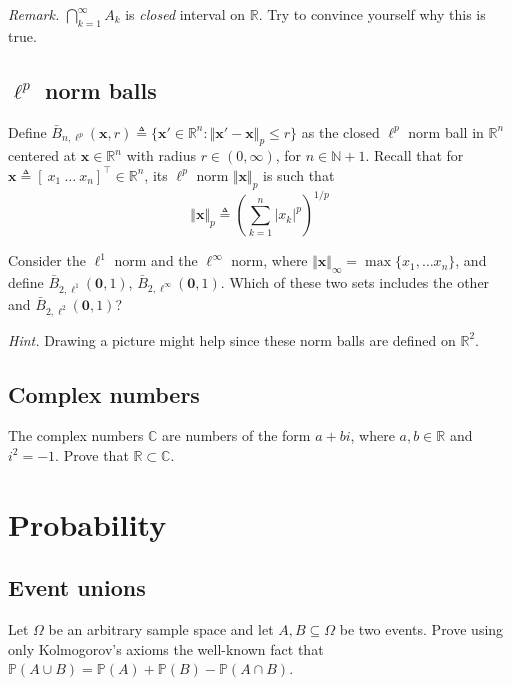 \documentclass{article}
\numberwithin{equation}{section}
\begin{document}
\medskip

\textit{Remark.} $ \bigcap_{k = 1}^\infty A_k $ is \textit{closed} interval
on $ \mathbb{R} $. Try to convince yourself why this is true.

\subsection{$ \ell^p $ norm balls}

Define $ \bar{B}_{n, \ell^p}(\mathbf{x}, r) \triangleq \{\mathbf{x}' \in
\mathbb{R}^n : \Vert\mathbf{x}' - \mathbf{x}\Vert_p \le r\} $ as the closed
$ \ell^p $ norm ball in $ \mathbb{R}^n $ centered at $ \mathbf{x}
\in \mathbb{R}^n $ with radius $ r \in (0, \infty) $, for
$ n \in \mathbb{N} + 1 $. Recall that for
$ \mathbf{x} \triangleq [ \ x_1 \ \ldots \ x_n ]^\top \in \mathbb{R}^n $, its
$ \ell^p $ norm $ \Vert\mathbf{x}\Vert_p $ is such that
\begin{equation*}
    \Vert\mathbf{x}\Vert_p \triangleq
    \left(\sum_{k = 1}^n|x_k|^p\right)^{1 / p}
\end{equation*}

Consider the $ \ell^1 $ norm and the $ \ell^\infty $ norm, where
$ \Vert\mathbf{x}\Vert_\infty = \max\{x_1, \ldots x_n\} $, and define
$ \bar{B}_{2, \ell^1}(\mathbf{0}, 1) $,
$ \bar{B}_{2, \ell^\infty}(\mathbf{0}, 1) $.
Which of these two sets includes the other and
$ \bar{B}_{2, \ell^2}(\mathbf{0}, 1) $?

\medskip

\textit{Hint.} Drawing a picture might help since these norm balls are
defined on $ \mathbb{R}^2 $.

\subsection{Complex numbers}

The complex numbers $ \mathbb{C} $ are numbers of the form $ a + bi $, where
$ a, b \in \mathbb{R} $ and $ i^2 = -1 $. Prove that
$ \mathbb{R} \subset \mathbb{C} $.

\section{Probability}

\subsection{Event unions}

Let $ \Omega $ be an arbitrary sample space and let $ A, B \subseteq \Omega $
be two events. Prove using only Kolmogorov's axioms the well-known fact that
$ \mathbb{P}(A \cup B) = \mathbb{P}(A) + \mathbb{P}(B) -
\mathbb{P}(A \cap B) $.
\end{document}
